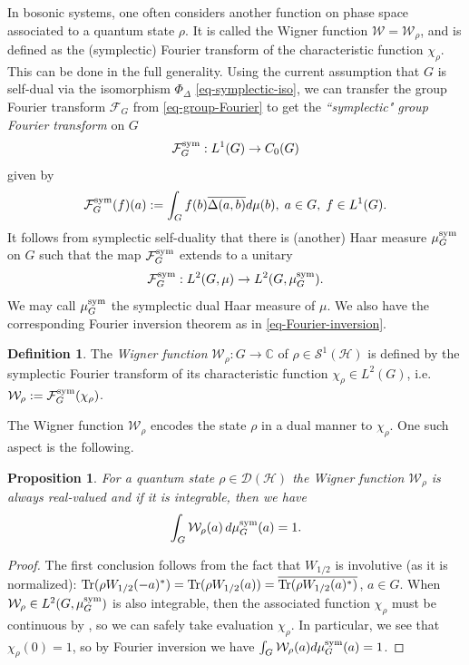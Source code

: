 \documentclass[12pt,reqno]{amsart}
\newtheorem{prop}[thm]{Proposition}
\theoremstyle{definition}
\theoremstyle{definition}
\newtheorem{defn}[thm]{Definition}
\theoremstyle{definition}
\numberwithin{thm}{section}
\numberwithin{equation}{section}
\newcommand{\Comp}{\mathbb{C}}
\newcommand{\D}{\mathcal{D}}
\newcommand{\F}{\mathcal{F}}
\newcommand{\Hi}{\mathcal{H}}
\newcommand{\W}{\mathcal{W}}
\newcommand{\mc}[1]{\mathcal #1}
\begin{document}
In bosonic systems, one often considers another function on phase space associated to a quantum state $\rho$. It is called the Wigner function $\W = \W_\rho$, and is defined as the (symplectic) Fourier transform of the characteristic function $\chi_\rho$. This can be done in the full generality. Using the current assumption that $G$ is self-dual via the isomorphism $\Phi_\Delta$ \eqref{eq-symplectic-iso}, we can transfer the group Fourier transform $\F_G$ from \eqref{eq-group-Fourier} to get the {\em ``symplectic" group Fourier transform} on $G$
    $$\F^{\rm sym}_G: L^1(G) \to C_0(G)$$
given by
    $$\F^{\rm sym}_G(f)(a) := \int_G f(b) \overline{\Delta(a,b)}d\mu(b),\; a\in G,\; f\in L^1(G).$$
It follows from symplectic self-duality that there is (another) Haar measure $\mu^{\rm sym}_G$ on $G$ such that the map $\F^{\rm sym}_G$ extends to a unitary
    \begin{equation}\label{eq-dual-Haar-symplectic}
        \F^{\rm sym}_G: L^2(G, \mu) \to L^2(G, \mu^{\rm sym}_G).
    \end{equation}
We may call $\mu^{\rm sym}_G$ the symplectic dual Haar measure of $\mu$. We also have the corresponding Fourier inversion theorem as in \eqref{eq-Fourier-inversion}.

	\begin{defn} \label{defn-Wignerftn}
		The {\em Wigner function} $\W_\rho: G \to \Comp$ of $\rho \in \mc S^1(\Hi)$ is defined by the symplectic Fourier transform of its characteristic function $\chi_\rho \in L^2(G)$, i.e. $\W_\rho := \F^{\rm sym}_G(\chi_\rho)$.
	\end{defn}
The Wigner function $\W_\rho$ encodes the state $\rho$ in a dual manner to $\chi_\rho$. One such aspect is the following.
    \begin{prop}
        For a quantum state $\rho \in \D(\Hi)$ the Wigner function $\W_\rho$ is always real-valued and if it is integrable, then we have
            \begin{equation}\label{eq-Wigner-integral}
                \int_G \W_\rho(a)\, d\mu^{\rm sym}_G(a) = 1.
            \end{equation}
    \end{prop}
\begin{proof}
The first conclusion follows from the fact that $W_{1/2}$ is involutive (as it is normalized): ${\rm Tr}(\rho W_{1/2}(-a)^*) = {\rm Tr}(\rho W_{1/2}(a)) = \overline{{\rm Tr}(\rho W_{1/2}(a)^*)}$, $a\in G$. When $\W_\rho\in L^2(G, \mu^{\rm sym}_G)$ is also integrable, then the associated function $\chi_\rho$ must be continuous by \cite[Theorem 4.4.13]{ReiSte}, so we can safely take evaluation $\chi_\rho$. In particular, we see that $\chi_\rho(0)=1$, so by Fourier inversion we have $\int_G \W_\rho(a) d\mu^{\rm sym}_G(a) = 1$.
\end{proof}
\end{document}
